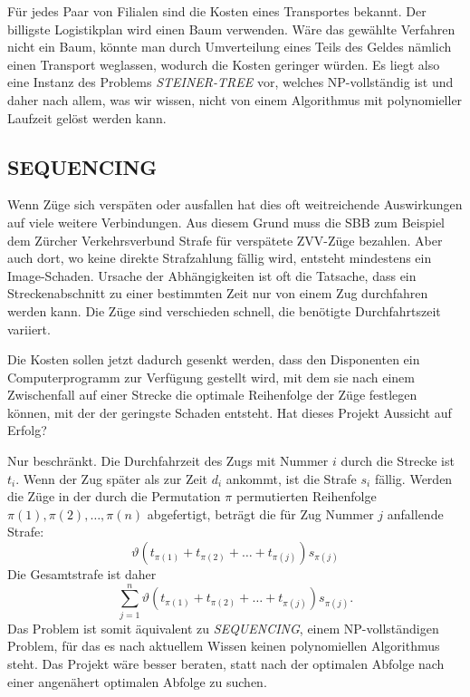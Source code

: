 \medskip

Für jedes Paar von Filialen sind die Kosten eines Transportes
bekannt. Der billigste Logistikplan wird einen Baum verwenden.
Wäre das gewählte Verfahren nicht ein Baum, könnte man
durch Umverteilung eines Teils des Geldes nämlich einen
Transport weglassen, wodurch die Kosten geringer würden.
Es liegt also eine Instanz des Problems {\it STEINER-TREE}
vor, welches NP-vollständig ist und daher nach allem, was
wir wissen, nicht von einem Algorithmus mit polynomieller
Laufzeit gelöst werden kann.

\subsection{SEQUENCING}
Wenn Züge sich verspäten oder ausfallen hat dies oft weitreichende
Auswirkungen auf viele weitere Verbindungen.
Aus diesem Grund muss die SBB zum Beispiel dem Zürcher Verkehrsverbund
Strafe für verspätete ZVV-Züge bezahlen. Aber auch dort, wo
keine direkte Strafzahlung fällig wird, entsteht mindestens ein
Image-Schaden. Ursache der Abhängigkeiten ist oft die Tatsache,
dass ein Streckenabschnitt zu einer bestimmten Zeit nur von einem
Zug durchfahren werden kann. Die Züge sind verschieden schnell,
die benötigte Durchfahrtszeit variiert. 

Die Kosten sollen jetzt dadurch gesenkt werden, dass den Disponenten
ein Computerprogramm zur Verfügung gestellt wird, mit dem sie nach
einem Zwischenfall auf einer Strecke die optimale Reihenfolge der Züge
festlegen können, mit der der geringste Schaden entsteht.
Hat dieses Projekt Aussicht auf Erfolg?

\medskip

Nur beschränkt.
Die Durchfahrzeit des Zugs mit Nummer $i$ durch die Strecke ist $t_i$.
Wenn der Zug später als zur Zeit $d_i$ ankommt, ist die Strafe $s_i$
fällig.
Werden die Züge in der durch die Permutation $\pi$
permutierten Reihenfolge  $\pi(1),\pi(2),\dots,\pi(n)$ abgefertigt,
beträgt die für Zug Nummer $j$ anfallende Strafe:
\[
\vartheta(t_{\pi(1)}+t_{\pi(2)}+\dots+t_{\pi(j)})s_{\pi(j)}
\]
Die Gesamtstrafe ist daher
\[
\sum_{j=1}^n \vartheta(t_{\pi(1)}+t_{\pi(2)}+\dots+t_{\pi(j)})s_{\pi(j)}.
\]
Das Problem ist somit äquivalent zu {\it SEQUENCING}, einem
NP-vollständigen Problem, für das es nach aktuellem Wissen keinen
polynomiellen Algorithmus steht. Das Projekt wäre besser beraten,
statt nach der optimalen Abfolge nach einer angenähert optimalen Abfolge
zu suchen.


